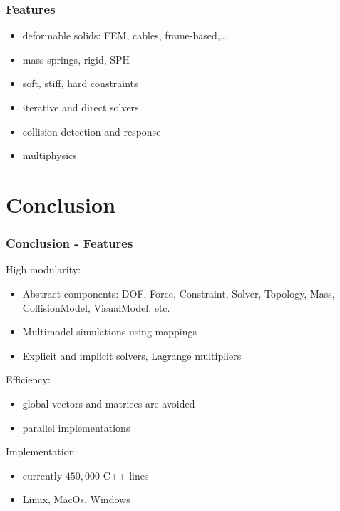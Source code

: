 \documentclass[a4paper,compress]{beamer}
\begin{document}
\begin{frame}
 \frametitle{Features}
\begin{itemize}
 \item deformable solids: FEM, cables, frame-based,…
 \item mass-springs, rigid, SPH
 \item soft, stiff, hard constraints
 \item iterative and direct solvers
 \item collision detection and response
 \item multiphysics
\end{itemize}

\end{frame}




\section{Conclusion}


\begin{frame}
 \frametitle{Conclusion - Features}
High modularity:
\begin{itemize}
 \item Abstract components: DOF, Force, Constraint, Solver, Topology, Mass, CollisionModel, VisualModel, etc. 
 \item Multimodel simulations using mappings
 \item Explicit and implicit solvers, Lagrange multipliers
\end{itemize}
Efficiency:
\begin{itemize}
 \item global vectors and matrices are avoided
 \item parallel implementations
\end{itemize}
Implementation:
\begin{itemize}
 \item currently $450,000$ C++ lines
 \item Linux, MacOs, Windows
\end{itemize}

\end{frame}


\end{document}
